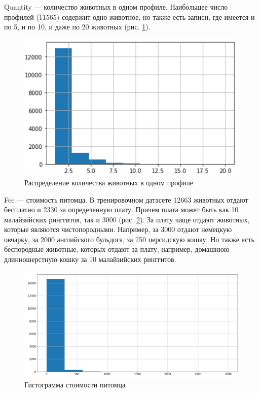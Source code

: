 \documentclass[14pt]{mmcs_article}
\begin{document}
Quantity --- количество животных в одном профиле. Наибольшее число профилей (11565) содержит одно животное, но также есть записи, где имеется и по 5, и по 10, и даже по 20 животных (рис. \ref{analyse:count}). 

\begin{figure}[H]
	\centering
	\includegraphics[scale=1]{count.png}
	\caption{Распределение количества животных в одном профиле}\label{analyse:count}
\end{figure}

Fee --- стоимость питомца. В тренировочном датасете 12663 животных отдают бесплатно и 2330 за определенную плату. Причем плата может быть как 10 малайзийских ринггитов, так и 3000 (рис. \ref{analyse:fee}). За плату чаще отдают животных, которые являются чистопородными. Например, за 3000 отдают немецкую овчарку, за 2000 английского бульдога, за 750 персидскую кошку. Но также есть беспородные животные, которых отдают за плату, например, домашнюю длинношерстную кошку за 10 малайзийских ринггитов.

\begin{figure}[H]
	\centering
	\includegraphics[scale=0.5]{fee.png}
	\caption{Гистограмма стоимости питомца}\label{analyse:fee}
\end{figure}
\end{document}
